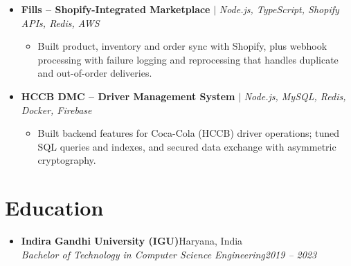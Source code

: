 \documentclass[letterpaper,10pt]{article}
\newcommand{\itemx}[1]{\item\small{#1\vspace{-2pt}}}
\newcommand{\subheading}[4]{\item \textbf{#1}\hfill #2\\\textit{\small #3}\hfill\textit{\small #4}\vspace{-5pt}}
\newcommand{\project}[2]{\item \small{\textbf{#1} $|$ \emph{#2}}\vspace{-5pt}}
\begin{document}
\begin{itemize}[leftmargin=.15in,label={}]
\begin{itemize}[leftmargin=.18in]
\end{itemize}
\project{Fills -- Shopify-Integrated Marketplace}{Node.js, TypeScript, Shopify APIs, Redis, AWS}
\begin{itemize}[leftmargin=.18in]
\itemx{Built product, inventory and order sync with Shopify, plus webhook processing with failure logging and reprocessing that handles duplicate and out-of-order deliveries.}
\end{itemize}
\project{HCCB DMC -- Driver Management System}{Node.js, MySQL, Redis, Docker, Firebase}
\begin{itemize}[leftmargin=.18in]
\itemx{Built backend features for Coca-Cola (HCCB) driver operations; tuned SQL queries and indexes, and secured data exchange with asymmetric cryptography.}
\end{itemize}
\end{itemize}

\section{Education}
\begin{itemize}[leftmargin=.15in,label={}]
\subheading{Indira Gandhi University (IGU)}{Haryana, India}{Bachelor of Technology in Computer Science Engineering}{2019 -- 2023}
\end{itemize}
\end{document}
